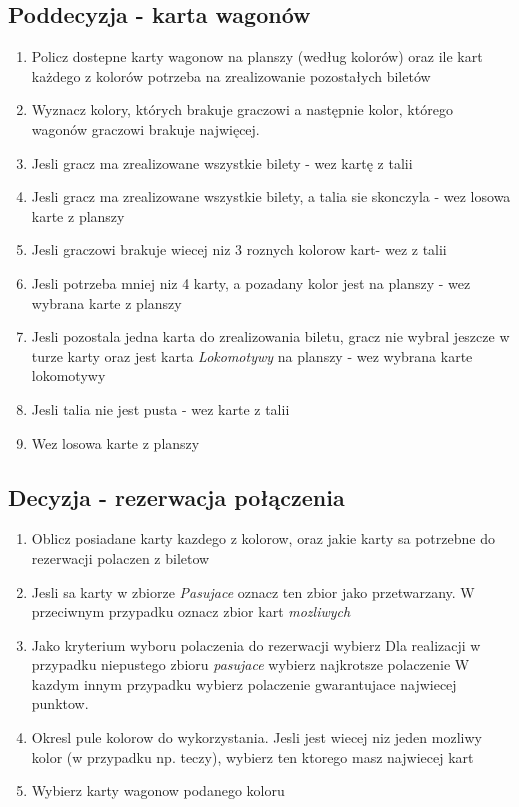 \documentclass[12pt, oneside]{report}
\begin{document}
\subsection{Poddecyzja - karta wagonów}
\begin{enumerate}
	\item Policz dostepne karty wagonow na planszy (według kolorów) oraz ile kart każdego z kolorów potrzeba na zrealizowanie pozostałych biletów
	\item Wyznacz kolory, których brakuje graczowi a następnie kolor, którego wagonów graczowi brakuje najwięcej.
	\item Jesli gracz ma zrealizowane wszystkie bilety - wez kartę z talii 
	\item Jesli gracz ma zrealizowane wszystkie bilety, a talia sie skonczyla - wez losowa karte z planszy
	\item Jesli graczowi brakuje wiecej niz 3 roznych kolorow kart- wez z talii
	\item Jesli potrzeba mniej niz 4 karty, a pozadany kolor jest na planszy - wez wybrana karte z planszy
	\item Jesli pozostala jedna karta do zrealizowania biletu, gracz nie wybral jeszcze w turze karty oraz jest karta \textit{Lokomotywy} na planszy - wez wybrana karte lokomotywy
	\item Jesli talia nie jest pusta - wez karte z talii
	\item Wez losowa karte z planszy
\end{enumerate}
\subsection{Decyzja - rezerwacja połączenia}
\begin{enumerate}
	\item Oblicz posiadane karty kazdego z kolorow, oraz jakie karty sa potrzebne do rezerwacji polaczen z biletow
	\item Jesli sa karty w zbiorze \textit{Pasujace} oznacz ten zbior jako przetwarzany. W przeciwnym przypadku oznacz zbior kart \textit{mozliwych}
	\item Jako kryterium wyboru polaczenia do rezerwacji wybierz
	\subitem Dla realizacji w przypadku niepustego zbioru \textit{pasujace} wybierz najkrotsze polaczenie
	\subitem W kazdym innym przypadku wybierz polaczenie gwarantujace najwiecej punktow.
	
	\item Okresl pule kolorow do wykorzystania. Jesli jest wiecej niz jeden mozliwy kolor (w przypadku np. teczy), wybierz ten ktorego masz najwiecej kart
	\item Wybierz karty wagonow podanego koloru
\end{enumerate}
\end{document}
